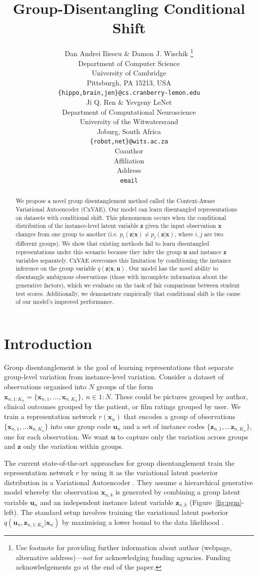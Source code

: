 \documentclass{article} %
\title{Group-Disentangling Conditional Shift}
\author{Dan Andrei Iliescu \& Damon J. Wischik \thanks{ Use footnote for providing further information
about author (webpage, alternative address)---\emph{not} for acknowledging
funding agencies.  Funding acknowledgements go at the end of the paper.} \\
Department of Computer Science\\
University of Cambridge\\
Pittsburgh, PA 15213, USA \\
\texttt{\{hippo,brain,jen\}@cs.cranberry-lemon.edu} \\
\And
Ji Q. Ren \& Yevgeny LeNet \\
Department of Computational Neuroscience \\
University of the Witwatersrand \\
Joburg, South Africa \\
\texttt{\{robot,net\}@wits.ac.za} \\
\AND
Coauthor \\
Affiliation \\
Address \\
\texttt{email}
}
\begin{document}
\maketitle

\begin{abstract}
We propose a novel group disentanglement method called the Context-Aware Variational Autoencoder (CxVAE). Our model can learn disentangled representations on datasets with conditional shift. This phenomenon occurs when the conditional distribution of the instance-level latent variable $\mathbf{z}$ given the input observation $\mathbf{x}$ changes from one group to another (i.e. $p_i(\mathbf{z}|\mathbf{x}) \neq p_j(\mathbf{z}|\mathbf{x})$, where $i,j$ are two different groups). We show that existing methods fail to learn disentangled representations under this scenario because they infer the group $\mathbf{u}$ and instance $\mathbf{z}$ variables separately. CxVAE overcomes this limitation by conditioning the instance inference on the group variable $q(\mathbf{z}|\mathbf{x},\mathbf{u})$. Our model has the novel ability to disentangle ambiguous observations (those with incomplete information about the generative factors), which we evaluate on the task of fair comparisons between student test scores. Additionally, we demonstrate empirically that conditional shift is the cause of our model's improved performance.
\end{abstract}

\section{Introduction}
\label{intro}

Group disentanglement is the goal of learning representations that separate group-level variation from instance-level variation. Consider a dataset of observations organised into $N$ groups of the form $\mathbf{x}_{n,1:K_n} = \{\mathbf{x}_{n,1}, ..., \mathbf{x}_{n,K_n}\}, ~ n \in 1:N$. These could be pictures grouped by author, clinical outcomes grouped by the patient, or film ratings grouped by user.  We train a representation network $r(\mathbf{x}_n)$ that encodes a group of observations $\{\mathbf{x}_{n, 1}, \dots \mathbf{x}_{n,K_n}\}$ into one group code $\mathbf{u}_n$ and a set of instance codes $\{\mathbf{z}_{n,1}, \dots \mathbf{z}_{n, K_n}\}$, one for each observation. We want $\mathbf{u}$ to capture only the variation across groups and $\mathbf{z}$ only the variation within groups. 

The current state-of-the-art approaches for group disentanglement train the representation network $r$ by using it as the variational latent posterior distribution in a Variational Autoencoder \citep{Bouchacourt2018MultiLevelVA, Hosoya2019GroupbasedLO, Nmeth2020AdversarialDW}. They assume a hierarchical generative model whereby the observation $\mathbf{x}_{n,k}$ is generated by combining a group latent variable $\mathbf{u}_n$ and an independent instance latent variable $\mathbf{z}_{n,k}$ (Figure~\ref{fig:pgm}-left). The standard setup involves training the variational latent posterior $q(\mathbf{u}_n, \mathbf{z}_{n,1:K_n} | \mathbf{x}_n)$ by maximising a lower bound to the data likelihood \citep{Kingma2014AutoEncodingVB, JimenezRezende2014StochasticBA}. 
\end{document}
